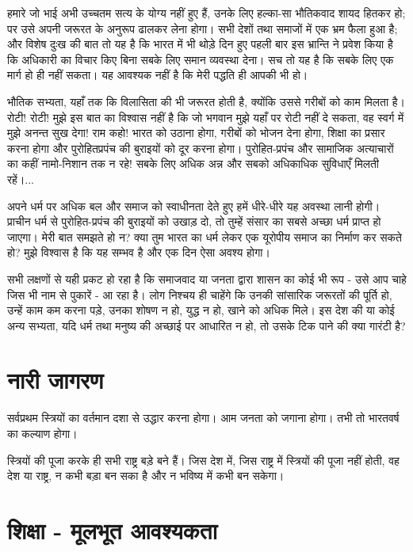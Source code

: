हमारे जो भाई अभी उच्चतम सत्य के योग्य नहीं हुए हैं, उनके लिए हल्का-सा भौतिकवाद शायद हितकर हो; पर उसे अपनी जरूरत के अनुरूप ढालकर लेना होगा। सभी देशों तथा समाजों में एक भ्रम फैला हुआ है; और विशेष दुःख की बात तो यह है कि भारत में भी थोड़े दिन हुए पहली बार इस भ्रान्ति ने प्रवेश किया है कि अधिकारी का विचार किए बिना सबके लिए समान व्यवस्था देना। सच तो यह है कि सबके लिए एक मार्ग हो ही नहीं सकता। यह आवश्यक नहीं है कि मेरी पद्धति ही आपकी भी हो। 

भौतिक सभ्यता, यहाँ तक कि विलासिता की भी जरूरत होती है, क्योंकि उससे गरीबों को काम मिलता है। रोटी! रोटी! मुझे इस बात का विश्वास नहीं है कि जो भगवान मुझे यहाँ पर रोटी नहीं दे सकता, वह स्वर्ग में मुझे अनन्त सुख देगा! राम कहो! भारत को उठाना होगा, गरीबों को भोजन देना होगा, शिक्षा का प्रसार करना होगा और पुरोहितप्रपंच की बुराइयों को दूर करना होगा। पुरोहित-प्रपंच और सामाजिक अत्याचारों का कहीं नामो-निशान तक न रहे! सबके लिए अधिक अन्न और सबको अधिकाधिक सुविधाएँ मिलती रहें।... 

अपने धर्म पर अधिक बल और समाज को स्वाधीनता देते हुए हमें धीरे-धीरे यह अवस्था लानी होगी। प्राचीन धर्म से पुरोहित-प्रपंच की बुराइयों को उखाड़ दो, तो तुम्हें संसार का सबसे अच्छा धर्म प्राप्त हो जाएगा। मेरी बात समझते हो न? क्या तुम भारत का धर्म लेकर एक यूरोपीय समाज का निर्माण कर सकते हो? मुझे विश्वास है कि यह सम्भव है और एक दिन ऐसा अवश्य होगा। 

सभी लक्षणों से यही प्रकट हो रहा है कि समाजवाद या जनता द्वारा शासन का कोई भी रूप - उसे आप चाहे जिस भी नाम से पुकारें - आ रहा है। लोग निश्चय ही चाहेंगे कि उनकी सांसारिक जरूरतों की पूर्ति हो, उन्हें काम कम करना पड़े, उनका शोषण न हो, युद्ध न हो, खाने को अधिक मिले। इस देश की या कोई अन्य सभ्यता, यदि धर्म तथा मनुष्य की अच्छाई पर आधारित न हो, तो उसके टिक पाने की क्या गारंटी है?


\section*{नारी जागरण}


सर्वप्रथम स्त्रियों का वर्तमान दशा से उद्धार करना होगा। आम जनता को जगाना होगा। तभी तो भारतवर्ष का कल्याण होगा। 

स्त्रियों की पूजा करके ही सभी राष्ट्र बड़े बने हैं। जिस देश में, जिस राष्ट्र में स्त्रियों की पूजा नहीं होती, वह देश या राष्ट्र, न कभी बड़ा बन सका है और न भविष्य में कभी बन सकेगा।


\section*{शिक्षा - मूलभूत आवश्यकता}


